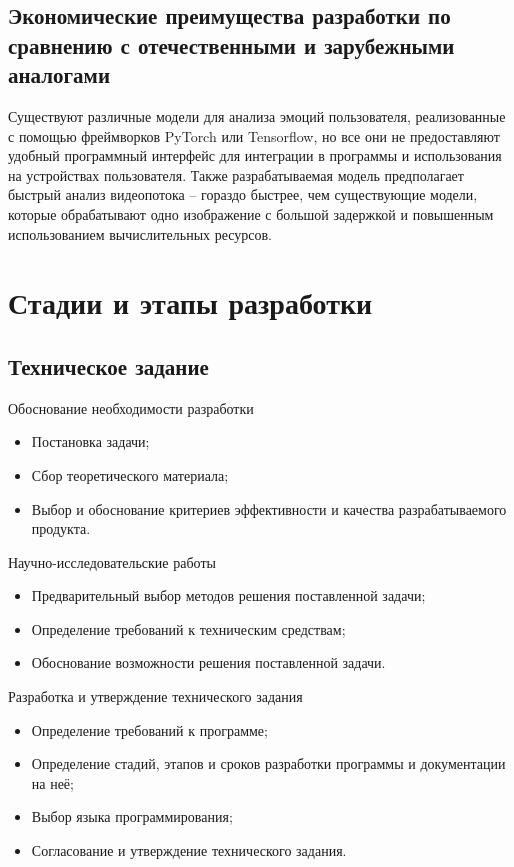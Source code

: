 \documentclass[a4paper,12pt,reqno]{article}
\begin{document}
    \subsection{Экономические преимущества разработки по сравнению с отечественными и зарубежными аналогами}
    Существуют различные модели для анализа эмоций пользователя, реализованные с помощью фреймворков PyTorch или Tensorflow, но все они не предоставляют удобный программный интерфейс для интеграции в программы и использования на устройствах пользователя. Также разрабатываемая модель предполагает быстрый анализ видеопотока -- гораздо быстрее, чем существующие модели, которые обрабатывают одно изображение с большой задержкой и повышенным использованием вычислительных ресурсов.

    \newpage
    \section{Стадии и этапы разработки}
    \subsection{Техническое задание}
    Обоснование необходимости разработки
    \begin{itemize}
        \item Постановка задачи;
        \item Сбор теоретического материала;
        \item Выбор и обоснование критериев эффективности и качества разрабатываемого продукта.
    \end{itemize}

    Научно-исследовательские работы
    \begin{itemize}
        \item Предварительный выбор методов решения поставленной задачи;
        \item Определение требований к техническим средствам;
        \item Обоснование возможности решения поставленной задачи.
    \end{itemize}

    Разработка и утверждение технического задания
    \begin{itemize}
        \item Определение требований к программе;
        \item Определение стадий, этапов и сроков разработки программы и документации на неё;
        \item Выбор языка программирования;
        \item Согласование и утверждение технического задания.
    \end{itemize}
\end{document}
